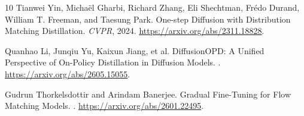 \documentclass[11pt,a4paper]{article}
\theoremstyle{plain}
\theoremstyle{definition}
\begin{document}
\begin{thebibliography}{10}
Tianwei Yin, Micha\"el Gharbi, Richard Zhang, Eli Shechtman, Fr\'edo Durand,
William T. Freeman, and Taesung Park.
\newblock One-step Diffusion with Distribution Matching Distillation.
\newblock \emph{CVPR}, 2024.
\newblock \url{https://arxiv.org/abs/2311.18828}.

Quanhao Li, Junqiu Yu, Kaixun Jiang, et al.
\newblock DiffusionOPD: A Unified Perspective of On-Policy Distillation in Diffusion Models.
.
\newblock \url{https://arxiv.org/abs/2605.15055}.

Gudrun Thorkelsdottir and Arindam Banerjee.
\newblock
Gradual Fine-Tuning for Flow Matching Models.
.
\newblock \url{https://arxiv.org/abs/2601.22495}.

\end{thebibliography}
\end{document}
